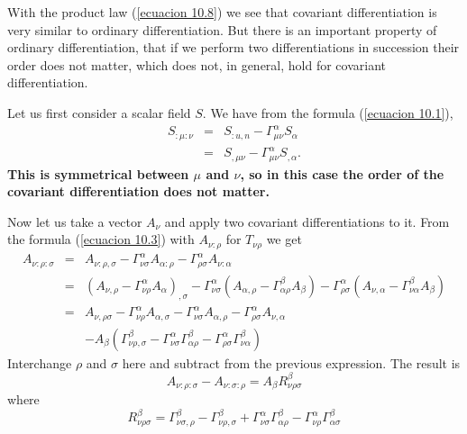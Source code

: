 With the product law (\ref{ecuacion 10.8}) we see that covariant 
differentiation is very similar to ordinary differentiation. But there is an 
important property of ordinary differentiation, that if we perform two 
differentiations in succession their order does not matter, which does not, in 
general, hold for covariant differentiation.

Let us first consider a scalar field $S$. We have from the formula 
(\ref{ecuacion 10.1}),
\begin{equation}
 \label{ecuacion 11.1}
 \begin{array}{rcl}
 S_{:\mu:\nu} & = & S_{:u,n} - \Gamma^{\alpha}_{\mu\nu} S_{\alpha} \\
      & = & S_{,\mu\nu} - \Gamma^{\alpha}_{\mu\nu} S_{,\alpha}.
 \end{array}
\end{equation}
\textbf{This is symmetrical between $\mu$ and $\nu$, so in this 
case the order of the covariant differentiation does not matter.}

Now let us take a vector $A_{\nu}$ and apply two covariant differentiations to 
it. From the formula (\ref{ecuacion 10.3}) with $A_{\nu:\rho}$ for 
$T_{\nu\rho}$ we get
\[
 \begin{array}{rcl}
  A_{\nu:\rho:\sigma} & = & A_{\nu:\rho,\sigma} 
  - \Gamma^{\alpha}_{\nu\sigma} A_{\alpha:\rho}
  - \Gamma^{\alpha}_{\rho\sigma} A_{\nu:\alpha} \\
  & = &  \left(A_{\nu,\rho} - 
              \Gamma^{\alpha}_{\nu\rho} A_{\alpha} \right)_{,\sigma}
  - \Gamma^{\alpha}_{\nu\sigma} \left( 
      A_{\alpha,\rho} - \Gamma^{\beta}_{\alpha\rho} A_{\beta}
  \right)
  - \Gamma^{\alpha}_{\rho\sigma}  \left( 
      A_{\nu,\alpha} - \Gamma^{\beta}_{\nu\alpha} A_{\beta}
  \right)\\
  & = & A_{\nu,\rho\sigma} 
      - \Gamma^{\alpha}_{\nu\rho} A_{\alpha,\sigma}
      - \Gamma^{\alpha}_{\nu\sigma} A_{\alpha,\rho}
      - \Gamma^{\alpha}_{\rho\sigma} A_{\nu,\alpha}\\
      & & 
      -A_{\beta}\left(
        \Gamma^{\beta}_{\nu\rho,\sigma}
      - \Gamma^{\alpha}_{\nu\sigma}\Gamma^{\beta}_{\alpha\rho}
      - \Gamma^{\alpha}_{\rho\sigma}\Gamma^{\beta}_{\nu\alpha}
      \right)
 \end{array}
\]
Interchange $\rho$ and $\sigma$ here and subtract from the previous expression. 
The result is
\begin{equation}
 \label{ecuacion 11.2}
 A_{\nu:\rho:\sigma} - A_{\nu:\sigma:\rho} =
 A_{\beta}R^{\beta}_{\nu\rho\sigma}
\end{equation}
where
\begin{equation}
 \label{ecuacion 11.3}
 R^{\beta}_{\nu\rho\sigma} = 
 \Gamma^{\beta}_{\nu\sigma,\rho} - \Gamma^{\beta}_{\nu\rho,\sigma}
 + \Gamma^{\alpha}_{\nu\sigma}\Gamma^{\beta}_{\alpha\rho}
 - \Gamma^{\alpha}_{\nu\rho}\Gamma^{\beta}_{\alpha\sigma}
\end{equation}

